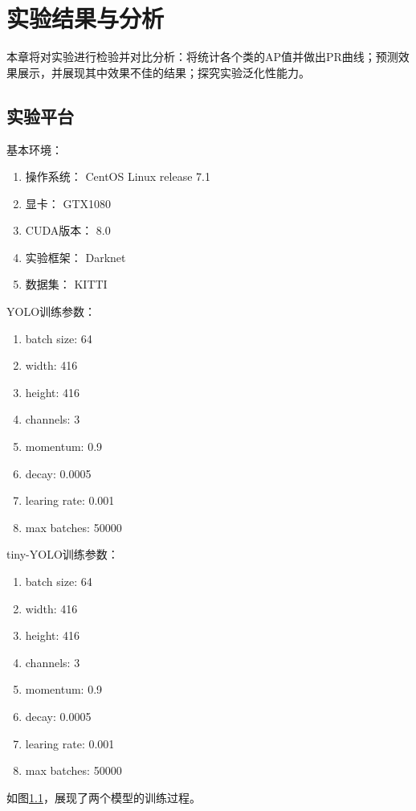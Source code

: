 \chapter{实验结果与分析}
本章将对实验进行检验并对比分析：将统计各个类的AP值并做出PR曲线；预测效果展示，并展现其中效果不佳的结果；探究实验泛化性能力。
\section{实验平台}{
	基本环境：
	\begin{enumerate}
		\item 操作系统： CentOS Linux release 7.1
		\item 显卡： GTX1080
		\item CUDA版本： 8.0
		\item 实验框架： Darknet
		\item 数据集： KITTI
	\end{enumerate}

	YOLO训练参数：
	\begin{enumerate}
		\item batch size: 64
		\item width: 416
		\item height: 416
		\item channels: 3
		\item momentum: 0.9
		\item decay: 0.0005
		\item learing rate: 0.001
		\item max batches: 50000
	\end{enumerate}

	tiny-YOLO训练参数：
	\begin{enumerate}
		\item batch size: 64
		\item width: 416
		\item height: 416
		\item channels: 3
		\item momentum: 0.9
		\item decay: 0.0005
		\item learing rate: 0.001
		\item max batches: 50000
	\end{enumerate}

	如图\ref{}，展现了两个模型的训练过程。
}

\newpage

